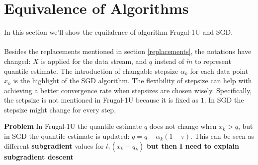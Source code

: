 \documentclass[11pt]{article}
\begin{document}
\section{Equivalence of Algorithms}
In this section we'll show the equilalence of algorithm Frugal-1U 
and SGD.
\\\\
Besides the replacements mentioned in section \ref{replacements},
the notations have changed: 
$X$ is applied for the data stream, and $q$ instead of $\tilde{m}$
to represent quantile estimate.
The introduction of changable stepsize $\alpha_k$ for each data point $x_k$
is the highlight of the SGD algorithm. The flexibility of stepsize can help
with achieving a better convergence rate when stepsizes are chosen wisely.
Specifically, the setpsize is not mentioned in Frugal-1U 
because it is fixed as $1$. In SGD the stepsize might change for every step.

{\color{red} \textbf{Problem}}
In Frugal-1U the quantile estimate $q$ does not change when $x_k > q$, but in SGD 
the quantile estimate is updated: $q = q-\alpha_k (1-\tau)$. This can be seen as different 
\textbf{subgradient} values for $l_\tau(x_k - q_k)$ 
{\color{red} \textbf{but then I need to explain subgradient descent}} 
\end{document}
